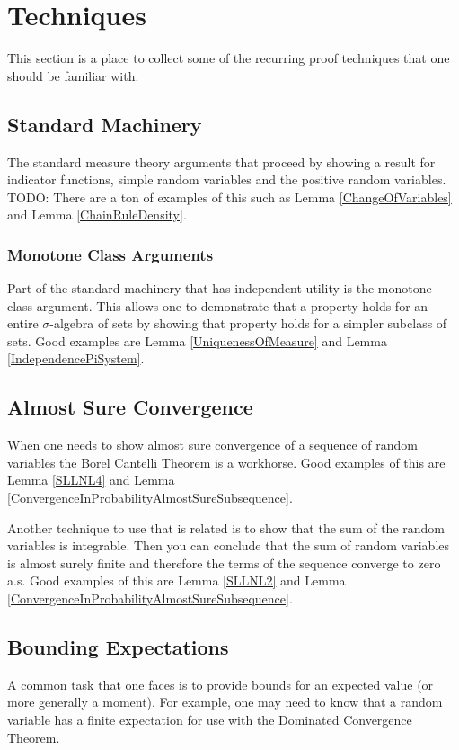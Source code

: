 \documentclass{amsbook}
\theoremstyle{definition}
\theoremstyle{remark}
\begin{document}
\appendix
\chapter{Techniques}

This section is a place to collect some of the recurring proof
techniques that one should be familiar with.

\section{Standard Machinery}
The standard measure theory arguments that proceed by showing a result
for indicator functions, simple random variables and the positive
random variables.  TODO:  There are a ton of examples of this such as
Lemma \ref{ChangeOfVariables} and Lemma \ref{ChainRuleDensity}.

\subsection{Monotone Class Arguments}
Part of the standard machinery that has independent utility is the
monotone class argument.  This allows one to demonstrate that a
property holds for an entire $\sigma$-algebra of sets by showing that
property holds for a simpler subclass of sets.  Good examples are
Lemma \ref{UniquenessOfMeasure} and Lemma \ref{IndependencePiSystem}.

\section{Almost Sure Convergence}
When one needs to show almost sure convergence of a sequence of random
variables the Borel Cantelli Theorem is a workhorse.  Good examples of
this are Lemma \ref{SLLNL4} and Lemma
\ref{ConvergenceInProbabilityAlmostSureSubsequence}.

Another technique to use that is related is to show that the sum of
the random variables is integrable.  Then you can conclude that the
sum of random variables is almost surely finite and therefore the
terms of the sequence converge to zero a.s.
Good examples of
this are Lemma \ref{SLLNL2} and Lemma
\ref{ConvergenceInProbabilityAlmostSureSubsequence}.

\section{Bounding Expectations}

A common task that one faces is to provide bounds for an expected
value (or more generally a moment).  For example, one may need to know
that a random variable has a finite expectation for use with the
Dominated Convergence Theorem.
\end{document}
